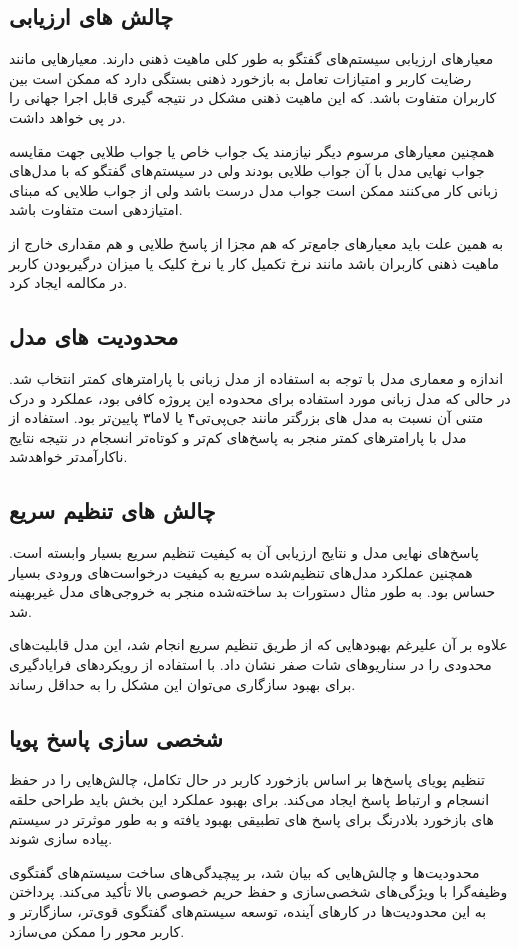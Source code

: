 \subsection{چالش های ارزیابی}
معیارهای ارزیابی سیستم‌های گفتگو به طور کلی ماهیت ذهنی دارند. معیارهایی مانند رضایت کاربر و امتیازات تعامل به بازخورد ذهنی بستگی دارد که ممکن است بین کاربران متفاوت باشد. که این ماهیت ذهنی مشکل در نتیجه گیری قابل اجرا جهانی را در پی خواهد داشت.

همچنین معیارهای مرسوم دیگر نیازمند یک جواب خاص یا جواب طلایی جهت مقایسه جواب نهایی مدل با آن جواب طلایی بودند ولی در سیستم‌های گفتگو که با مدل‌های زبانی کار می‌کنند ممکن است جواب مدل درست باشد ولی از جواب طلایی که مبنای امتیازدهی است متفاوت باشد.

به همین علت باید معیارهای جامع‌تر که هم مجزا از پاسخ طلایی و هم مقداری خارج از ماهیت ذهنی کاربران باشد مانند نرخ تکمیل کار یا نرخ کلیک یا میزان درگیربودن کاربر در مکالمه ایجاد کرد.

\subsection{محدودیت های مدل}
اندازه و معماری مدل با توجه به استفاده از مدل زبانی با پارامترهای کمتر انتخاب شد. در حالی که مدل زبانی مورد استفاده برای محدوده این پروژه کافی بود، عملکرد و درک متنی آن نسبت به مدل های بزرگتر مانند جی‌پی‌تی۴ یا لاما۳ پایین‌تر بود. استفاده از مدل با پارامترهای کمتر منجر به پاسخ‌های کم‌تر و کوتاه‌تر انسجام در نتیجه نتایج ناکارآمدتر خواهدشد.


\subsection{چالش های تنظیم سریع}
پاسخ‌های نهایی مدل و نتایج ارزیابی آن به کیفیت تنظیم سریع بسیار وابسته است. همچنین عملکرد مدل‌های تنظیم‌شده سریع به کیفیت درخواست‌های ورودی بسیار حساس بود. به طور مثال دستورات بد ساخته‌شده منجر به خروجی‌های مدل غیربهینه شد.

علاوه بر آن علیرغم بهبودهایی که از طریق تنظیم سریع انجام شد، این مدل قابلیت‌های محدودی را در سناریوهای شات صفر نشان داد. با استفاده از رویکردهای فرایادگیری برای بهبود سازگاری می‌توان این مشکل را به حداقل رساند.

\subsection{شخصی سازی پاسخ پویا}

تنظیم پویای پاسخ‌ها بر اساس بازخورد کاربر در حال تکامل، چالش‌هایی را در حفظ انسجام و ارتباط پاسخ ایجاد می‌کند.
برای بهبود عملکرد این بخش باید طراحی حلقه های بازخورد بلادرنگ برای پاسخ های تطبیقی بهبود یافته و به طور موثرتر در سیستم پیاده سازی شوند.

محدودیت‌ها و چالش‌هایی که بیان شد، بر پیچیدگی‌های ساخت سیستم‌های گفتگوی وظیفه‌گرا با ویژگی‌های شخصی‌سازی و حفظ حریم خصوصی بالا تأکید می‌کند. پرداختن به این محدودیت‌ها در کارهای آینده، توسعه سیستم‌های گفتگوی قوی‌تر، سازگارتر و کاربر محور را ممکن می‌سازد.

